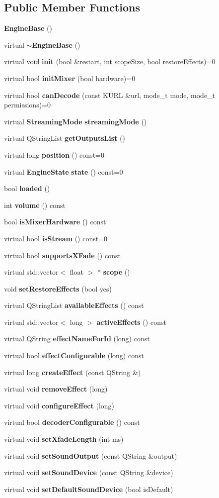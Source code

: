 \subsection*{Public Member Functions}
\begin{CompactItemize}
\item 
{\bf Engine\-Base} ()
\item 
virtual {\bf $\sim$Engine\-Base} ()
\item 
virtual void {\bf init} (bool \&restart, int scope\-Size, bool restore\-Effects)=0
\item 
virtual bool {\bf init\-Mixer} (bool hardware)=0
\item 
virtual bool {\bf can\-Decode} (const KURL \&url, mode\_\-t mode, mode\_\-t permissions)=0
\item 
virtual {\bf Streaming\-Mode} {\bf streaming\-Mode} ()
\item 
virtual QString\-List {\bf get\-Outputs\-List} ()
\item 
virtual long {\bf position} () const=0
\item 
virtual {\bf Engine\-State} {\bf state} () const=0
\item 
bool {\bf loaded} ()
\item 
int {\bf volume} () const 
\item 
bool {\bf is\-Mixer\-Hardware} () const 
\item 
virtual bool {\bf is\-Stream} () const=0
\item 
virtual bool {\bf supports\-XFade} () const 
\item 
virtual std::vector$<$ float $>$ $\ast$ {\bf scope} ()
\item 
void {\bf set\-Restore\-Effects} (bool yes)
\item 
virtual QString\-List {\bf available\-Effects} () const 
\item 
virtual std::vector$<$ long $>$ {\bf active\-Effects} () const 
\item 
virtual QString {\bf effect\-Name\-For\-Id} (long) const 
\item 
virtual bool {\bf effect\-Configurable} (long) const 
\item 
virtual long {\bf create\-Effect} (const QString \&)
\item 
virtual void {\bf remove\-Effect} (long)
\item 
virtual void {\bf configure\-Effect} (long)
\item 
virtual bool {\bf decoder\-Configurable} () const 
\item 
virtual void {\bf set\-Xfade\-Length} (int ms)
\item 
virtual void {\bf set\-Sound\-Output} (const QString \&output)
\item 
virtual void {\bf set\-Sound\-Device} (const QString \&device)
\item 
virtual void {\bf set\-Default\-Sound\-Device} (bool is\-Default)
\end{CompactItemize}
